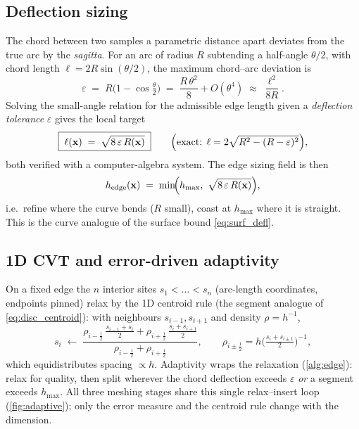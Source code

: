 \documentclass[11pt,a4paper]{article}
\numberwithin{equation}{section}
\newcommand{\vv}[1]{\mathbf{#1}}
\begin{document}
\subsection{Deflection sizing}
\label{sec:defl}
The chord between two samples a parametric distance apart deviates from the true
arc by the \emph{sagitta}. For an arc of radius $R$ subtending a half-angle
$\theta/2$, with chord length $\ell=2R\sin(\theta/2)$, the maximum chord--arc
deviation is
\begin{equation}
\label{eq:sagitta}
\varepsilon \;=\; R\bigl(1-\cos\tfrac{\theta}{2}\bigr)
            \;=\; \frac{R\,\theta^2}{8}+O(\theta^4)
            \;\approx\; \frac{\ell^2}{8R}.
\end{equation}
Solving the small-angle relation for the admissible edge length given a
\emph{deflection tolerance} $\varepsilon$ gives the local target
\begin{equation}
\boxed{\;\ell(\vv{x}) \;=\; \sqrt{8\,\varepsilon\,R(\vv{x})}\;}
\qquad\Bigl(\text{exact: } \ell=2\sqrt{R^2-(R-\varepsilon)^2}\Bigr),
\label{eq:defl_len}
\end{equation}
both verified with a computer-algebra system. The edge sizing field is then
\begin{equation}
\label{eq:edge_h}
h_{\text{edge}}(\vv{x}) \;=\; \min\!\Bigl(h_{\max},\ \sqrt{8\,\varepsilon\,R(\vv{x})}\Bigr),
\end{equation}
i.e.\ refine where the curve bends ($R$ small), coast at $h_{\max}$ where it is
straight. This is the curve analogue of the surface bound \eqref{eq:surf_defl}.

\subsection{1D CVT and error-driven adaptivity}
On a fixed edge the $n$ interior sites $s_1<\dots<s_n$ (arc-length coordinates,
endpoints pinned) relax by the 1D centroid rule (the segment analogue of
\eqref{eq:disc_centroid}): with neighbours $s_{i-1},s_{i+1}$ and density
$\rho=h^{-1}$,
\begin{equation}
\label{eq:cvt1d}
s_i \;\leftarrow\;
\frac{\rho_{i-\frac12}\,\tfrac{s_{i-1}+s_i}{2}
     +\rho_{i+\frac12}\,\tfrac{s_i+s_{i+1}}{2}}
     {\rho_{i-\frac12}+\rho_{i+\frac12}},
\qquad \rho_{i\pm\frac12}=h\!\bigl(\tfrac{s_i+s_{i\pm1}}{2}\bigr)^{-1},
\end{equation}
which equidistributes spacing $\propto h$. Adaptivity wraps the relaxation
(\cref{alg:edge}): relax for quality, then split wherever the chord deflection
exceeds $\varepsilon$ \emph{or} a segment exceeds $h_{\max}$. All three meshing
stages share this single relax--insert loop (\cref{fig:adaptive}); only the
error measure and the centroid rule change with the dimension.
\end{document}
